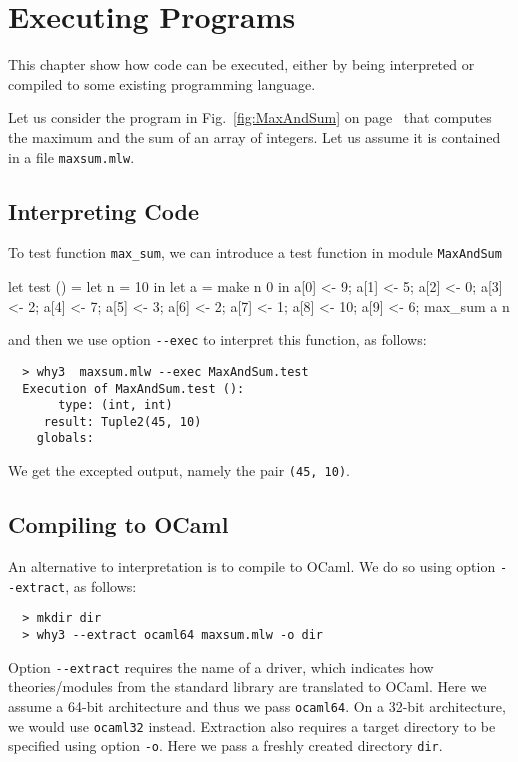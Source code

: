 
\chapter{Executing \whyml Programs}
\label{chap:exec}

This chapter show how \whyml code can be executed, either by being
interpreted or compiled to some existing programming language.

Let us consider the program in Fig.~\ref{fig:MaxAndSum}
on page~\pageref{fig:MaxAndSum} that computes the maximum and the sum
of an array of integers.
Let us assume it is contained in a file \texttt{maxsum.mlw}.

\section{Interpreting \whyml Code}

To test function \texttt{max\_sum}, we can introduce a \whyml test function
in module \texttt{MaxAndSum}
\begin{whycode}
  let test () =
    let n = 10 in
    let a = make n 0 in
    a[0] <- 9; a[1] <- 5; a[2] <- 0; a[3] <- 2;  a[4] <- 7;
    a[5] <- 3; a[6] <- 2; a[7] <- 1; a[8] <- 10; a[9] <- 6;
    max_sum a n
\end{whycode}
and then we use option \verb+--exec+ to interpret this function,
as follows:
\begin{verbatim}
  > why3  maxsum.mlw --exec MaxAndSum.test
  Execution of MaxAndSum.test ():
       type: (int, int)
     result: Tuple2(45, 10)
    globals:
\end{verbatim}
We get the excepted output, namely the pair \texttt{(45, 10)}.

\section{Compiling \whyml to OCaml}

An alternative to interpretation is to compile \whyml to OCaml.
We do so using option \verb+--extract+, as follows:
\begin{verbatim}
  > mkdir dir
  > why3 --extract ocaml64 maxsum.mlw -o dir
\end{verbatim}
Option \verb+--extract+ requires the name of a driver, which indicates
how theories/modules from the \why standard library are translated to
OCaml. Here we assume a 64-bit architecture and thus we pass
\texttt{ocaml64}. On a 32-bit architecture, we would use
\texttt{ocaml32} instead. Extraction also requires a target directory
to be specified using option \verb+-o+. Here we pass a freshly created
directory \texttt{dir}.

